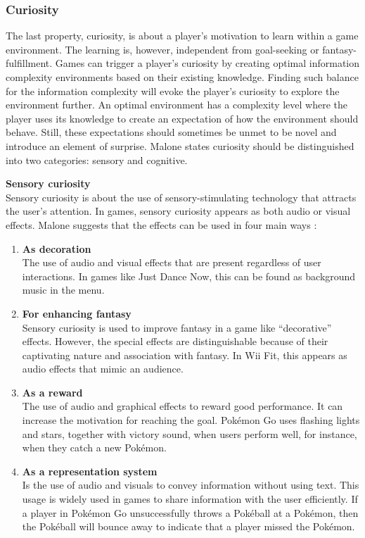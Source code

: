 \subsubsection{Curiosity}
The last property, curiosity, is about a player’s motivation to learn within a game environment. The learning is, however, independent from goal-seeking or fantasy-fulfillment. Games can trigger a player's curiosity by creating optimal information complexity environments based on their existing knowledge. Finding such balance for the information complexity will evoke the player’s curiosity to explore the environment further. An optimal environment has a complexity level where the player uses its knowledge to create an expectation of how the environment should behave. Still, these expectations should sometimes be unmet to be novel and introduce an element of surprise. Malone states curiosity should be distinguished into two categories: sensory and cognitive.

\textbf{Sensory curiosity} \\
Sensory curiosity is about the use of sensory-stimulating technology that attracts the user’s attention. In games, sensory curiosity appears as both audio or visual effects. Malone suggests that the effects can be used in four main ways \citep{malone_what_1980}:

\begin{enumerate}
    \item \textbf{As decoration} \\
    The use of audio and visual effects that are present regardless of user interactions. In games like Just Dance Now, this can be found as background music in the menu.
    \item \textbf{For enhancing fantasy} \\
    Sensory curiosity is used to improve fantasy in a game like “decorative” effects. However, the special effects are distinguishable because of their captivating nature and association with fantasy. In Wii Fit, this appears as audio effects that mimic an audience.
    \item \textbf{As a reward} \\
    The use of audio and graphical effects to reward good performance. It can increase the motivation for reaching the goal. Pokémon Go uses flashing lights and stars, together with victory sound, when users perform well, for instance, when they catch a new Pokémon.
    \item \textbf{As a representation system} \\
    Is the use of audio and visuals to convey information without using text. This usage is widely used in games to share information with the user efficiently. If a player in Pokémon Go unsuccessfully throws a Pokéball at a Pokémon, then the Pokéball will bounce away to indicate that a player missed the Pokémon.
\end{enumerate}

